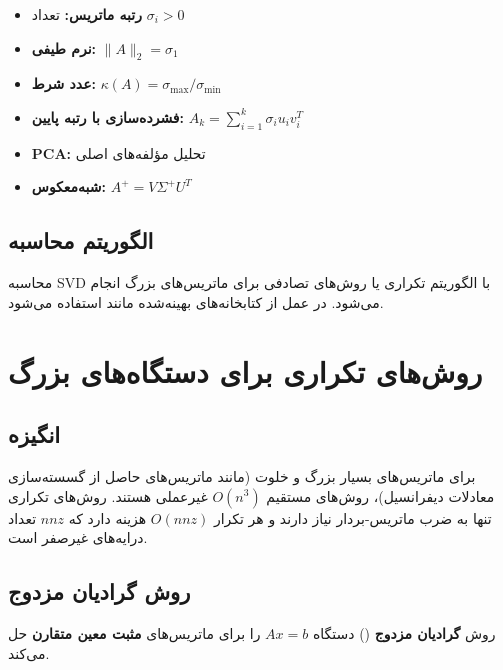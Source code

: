 \documentclass{matinbook}
\begin{document}
    \begin{itemize}
        \item \textbf{رتبه ماتریس:}
        تعداد $\sigma_{i} > 0$
        \item \textbf{نرم طیفی:}
        $\|A\|_{2} = \sigma_{1}$
        \item \textbf{عدد شرط:}
        $\kappa(A) = \sigma_{\max} / \sigma_{\min}$
        \item \textbf{فشرده‌سازی با رتبه پایین:}
        $A_{k} = \sum_{i=1}^{k} \sigma_{i} u_{i} v_{i}^{T}$
        \item \textbf{PCA:}
        تحلیل مؤلفه‌های اصلی
        \item \textbf{شبه‌معکوس:}
        $A^{+} = V \Sigma^{+} U^{T}$
    \end{itemize}
    
    \subsection{الگوریتم محاسبه}
    
    محاسبه SVD با الگوریتم تکراری
     یا روش‌های تصادفی
    برای ماتریس‌های بزرگ انجام می‌شود.
    در عمل از کتابخانه‌های بهینه‌شده
    مانند  استفاده می‌شود.
    
    \section{روش‌های تکراری برای دستگاه‌های بزرگ}
    
    \subsection{انگیزه}
    
    برای ماتریس‌های بسیار بزرگ و خلوت
    (مانند ماتریس‌های حاصل از
    گسسته‌سازی معادلات دیفرانسیل)،
    روش‌های مستقیم $O(n^{3})$ غیرعملی هستند.
    روش‌های تکراری
    تنها به ضرب ماتریس-بردار نیاز دارند
    و هر تکرار $O(nnz)$ هزینه دارد
    که $nnz$ تعداد درایه‌های غیرصفر است.
    
    \subsection{روش گرادیان مزدوج}
    
    \begin{definition}
        روش \textbf{گرادیان مزدوج}
        () دستگاه
        $Ax = b$ را برای ماتریس‌های
        \textbf{مثبت معین متقارن} حل می‌کند.
        \label{def:cg}
    \end{definition}
    
\end{document}
